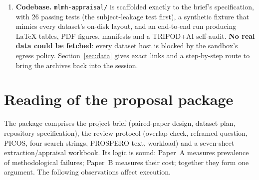 \documentclass[11pt,a4paper]{article}
\begin{document}
\begin{enumerate}
27-line numbering that does not follow the published checklist; the PROBAST sheet reproduces 2019
PROBAST. Adherence percentages will be challenged unless both are aligned to the official items.
\item \textbf{Codebase.} \texttt{mlmh-appraisal/} is scaffolded exactly to the brief's
specification, with 26 passing tests (the subject-leakage test first), a synthetic fixture that
mimics every dataset's on-disk layout, and an end-to-end run producing LaTeX tables, PDF figures,
manifests and a TRIPOD+AI self-audit. \textbf{No real data could be fetched}: every dataset host is
blocked by the sandbox's egress policy. Section~\ref{sec:data} gives exact links and a step-by-step
route to bring the archives back into the session.
\end{enumerate}

\section{Reading of the proposal package}
The package comprises the project brief (paired-paper design, dataset plan, repository
specification), the review protocol (overlap check, reframed question, PICOS, four search strings,
PROSPERO text, workload) and a seven-sheet extraction/appraisal workbook. Its logic is sound:
Paper~A measures prevalence of methodological failures; Paper~B measures their cost; together they
form one argument. The following observations affect execution.
\end{document}
